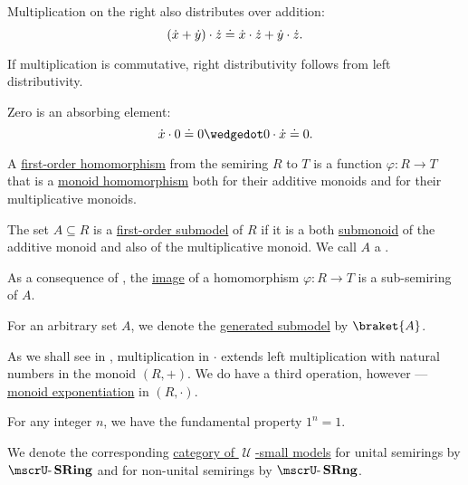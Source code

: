 \begin{definition}
\begin{thmenum}
\begin{thmenum}
       Multiplication on the right also distributes over addition:
      \begin{equation}\label{eq:def:semiring/right_distributivity}
        ({\dot{x}} + {\dot{y}}) \cdot {\dot{z}} \doteq {\dot{x}} \cdot {\dot{z}} + {\dot{y}} \cdot {\dot{z}}.
      \end{equation}

      If multiplication is commutative, right distributivity follows from left distributivity.

       Zero is an absorbing element:
      \begin{equation}\label{eq:def:semiring/absorption}
        \synx \cdot 0 \syneq 0 \synwedge 0 \cdot \synx \syneq 0.
      \end{equation}
    \end{thmenum}

     A \hyperref[def:first_order_homomorphism]{first-order homomorphism} from the semiring \( R \) to \( T \) is a function \( \varphi: R \to T \) that is a \hyperref[def:monoid/homomorphism]{monoid homomorphism} both for their additive monoids and for their multiplicative monoids.

     The set \( A \subseteq R \) is a \hyperref[def:first_order_submodel]{first-order submodel} of \( R \) if it is a both \hyperref[def:monoid/submodel]{submonoid} of the additive monoid and also of the multiplicative monoid. We call \( A \) a .

    As a consequence of , the \hyperref[def:set_valued_map/image]{image} of a homomorphism \( \varphi: R \to T \) is a sub-semiring of \( A \).

     For an arbitrary set \( A \), we denote the \hyperref[def:first_order_generated_substructure]{generated submodel} by \( \braket{ A } \).

     As we shall see in , multiplication in \( \cdot \) extends left multiplication with natural numbers in the monoid \( (R, +) \). We do have a third operation, however --- \hyperref[def:monoid/exponentiation]{monoid exponentiation} in \( (R, \cdot) \).

    For any integer \( n \), we have the fundamental property \( 1^n = 1 \).

     We denote the corresponding \hyperref[def:category_of_small_first_order_models]{category of \( \mscrU \)-small models} for unital semirings by \( \ucat{SRing} \) and for non-unital semirings by \( \ucat{SRng} \).


\end{thmenum}
\end{definition}
